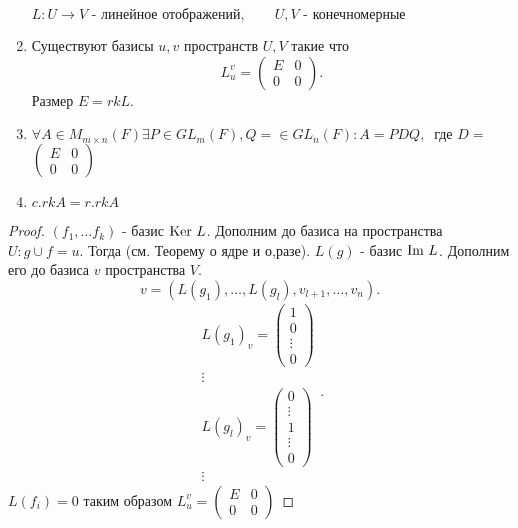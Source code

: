 \documentclass[11pt]{book}
\newcommand{\im}{{\mathop{\text{\rm Im}}}~}
\newcommand{\ke}{{\mathop{\text{\rm Ker}}}~}
\theoremstyle{definition}
\theoremstyle{plain}
\theoremstyle{plain}
\theoremstyle{definition}
\theoremstyle{remark}
\begin{document}
\begin{thm}
    \begin{enumerate}
    $L: U \to V \mbox{ - линейное отображений}, \qquad U, V \mbox{ - конечномерные}$
\item Существуют базисы $u, v$ пространств $U, V$ такие что \[
   L_u ^v = 
\left ( 
\begin{array}{cc}
	E & 0 \\
	0 & 0
\end{array}
\right )
   .\]  
   Размер $E = rk L$.
   \item $\forall A \in M_{m \times n} (F) \exists  P \in GL_m (F), Q = \in GL_n (F): A = P D Q, \: \mbox{ где } D =  $
$\left ( \begin{array}{cc}
    E & 0 \\ 0 & 0
\end{array}
\right )
       $
   \item $c. rk A = r. rk A$
    \end{enumerate}
\end{thm}
\begin{proof}
    $(f_1, \ldots f_k) $ - базис $\ke L$. Дополним до базиса на пространства $U: g \cup f = u $. Тогда (см. Теорему о ядре и о,разе).  $L(g)$ - базис $\im L$. Дополним его до базиса  $v$ пространства $V$.
    \[
	v = (L(g_1), \ldots , L(g_l), v_{l+1}, \ldots, v_n)
    .\]
    \[
	\begin{array}{l}
	L(g_1)_v = 
	\left ( 
	\begin{array}{c}
	1 \\ 0 \\ \vdots \\ 0
	\end{array}
	\right ) \\
	\vdots \\
	L(g_l)_v = 
	\left ( 
	\begin{array}{c}
	0 \\ \vdots \\ 1 \\ \vdots \\ 0
	\end{array}
	\right )\\
	\vdots
    \end{array}
    .\] 
    $L(f_i) = 0$
    таким образом $L_u ^v = %
\left ( 
\begin{array}{cc}
	E & 0 \\
	0 & 0
\end{array}
\right )
    $
\end{proof}
\end{document}

